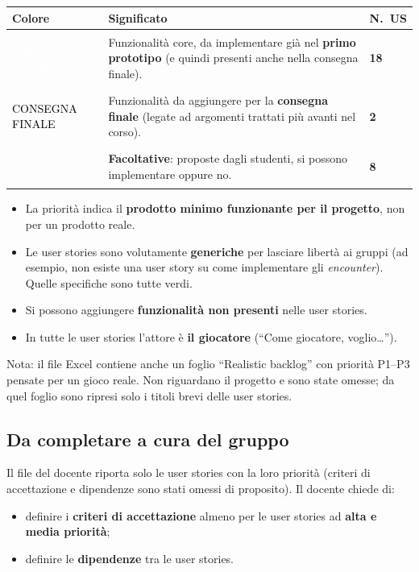 \documentclass[11pt,a4paper]{article}
\newcommand{\badge}[3]{{\setlength{\fboxsep}{2.2pt}\colorbox{#1}{\textcolor{#2}{\scriptsize\bfseries\strut #3}}}}
\newcommand{\rosso}{\badge{prRed}{white}{PRIMA CONSEGNA}}
\newcommand{\giallo}{\badge{prYellow}{black}{CONSEGNA FINALE}}
\newcommand{\verde}{\badge{prGreen}{white}{OPZIONALE}}
\newcommand{\enc}{\emph{encounter}}
\begin{document}
\begin{center}
\renewcommand{\arraystretch}{1.5}
\begin{tabularx}{0.95\linewidth}{@{}C{3.2cm}Y C{1.6cm}@{}}
  \toprule
  \textbf{Colore} & \textbf{Significato} & \textbf{N.\ US} \\ \midrule
  \rosso   & Funzionalità core, da implementare già nel \textbf{primo prototipo} (e quindi presenti anche nella consegna finale). & \textbf{18} \\
  \giallo  & Funzionalità da aggiungere per la \textbf{consegna finale} (legate ad argomenti trattati più avanti nel corso). & \textbf{2} \\
  \verde   & \textbf{Facoltative}: proposte dagli studenti, si possono implementare oppure no. & \textbf{8} \\ \bottomrule
\end{tabularx}
\end{center}

\begin{notebox}
\begin{itemize}[leftmargin=1.2em]
  \item La priorità indica il \textbf{prodotto minimo funzionante per il progetto}, non per un prodotto reale.
  \item Le user stories sono volutamente \textbf{generiche} per lasciare libertà ai gruppi (ad esempio, non
        esiste una user story su come implementare gli \enc). Quelle specifiche sono tutte verdi.
  \item Si possono aggiungere \textbf{funzionalità non presenti} nelle user stories.
  \item In tutte le user stories l'attore è \textbf{il giocatore} (``Come giocatore, voglio\dots'').
\end{itemize}
\end{notebox}

{\footnotesize\color{midgray} Nota: il file Excel contiene anche un foglio ``Realistic backlog'' con priorità P1--P3
pensate per un gioco reale. Non riguardano il progetto e sono state omesse; da quel foglio sono ripresi solo
i titoli brevi delle user stories.\par}

\subsection{Da completare a cura del gruppo}\label{sec:completare}
Il file del docente riporta solo le user stories con la loro priorità (criteri di accettazione e dipendenze
sono stati omessi di proposito). Il docente chiede di:
\begin{itemize}
  \item definire i \textbf{criteri di accettazione} almeno per le user stories ad \textbf{alta e media priorità};
  \item definire le \textbf{dipendenze} tra le user stories.
\end{itemize}
\end{document}
